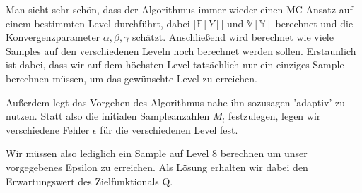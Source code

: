 Man sieht sehr schön, dass der Algorithmus immer wieder einen MC-Ansatz auf einem bestimmten Level durchführt, dabei $| \mathbb{E}[Y] |$ und $\mathbb{V[Y]}$ berechnet und die Konvergenzparameter $\alpha , \beta, \gamma$ schätzt. Anschließend wird berechnet wie viele Samples auf den verschiedenen Leveln noch berechnet werden sollen. 
Erstaunlich ist dabei, dass wir auf dem höchsten Level tatsächlich nur ein einziges Sample berechnen müssen, um das gewünschte Level zu erreichen.
\begin{figure}[H]
	\centering
\end{figure}
Außerdem legt das Vorgehen des Algorithmus nahe ihn sozusagen 'adaptiv' zu nutzen. Statt also die initialen Sampleanzahlen $M_l$ festzulegen, legen wir verschiedene Fehler $\epsilon$ für die verschiedenen Level fest.
\begin{figure}[H]
	\centering
\end{figure}
\begin{figure}[H]
	\centering
\end{figure}
Wir müssen also lediglich ein Sample auf Level 8 berechnen um unser vorgegebenes Epsilon zu erreichen.
Als Lösung erhalten wir dabei den Erwartungswert des Zielfunktionals Q.

 





			

